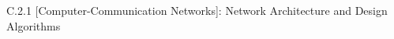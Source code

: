 \documentclass{sig-alternate-10pt-2013}
\begin{document}
\theoremstyle{definition}
\newtheorem{lemma}{Lemma}


\begin{sloppypar}


\iflongversion
\else
\begin{small}
\vspace{3pt}
 C.2.1 [Computer-Communication Networks]: Network Architecture and Design
\vspace{-2pt}
 Algorithms
\end{small}
\fi


%







%

\iflongversion
\begin{appendix}

\end{appendix}
\fi

\end{sloppypar}
\end{document}
